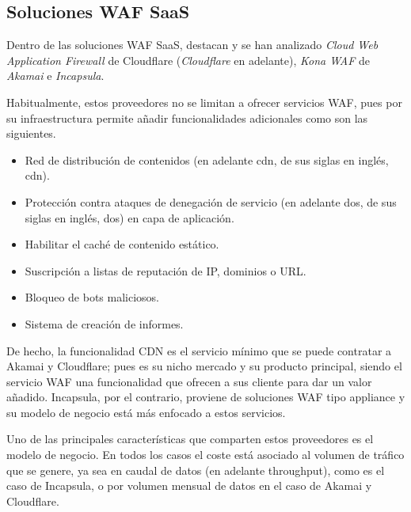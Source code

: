 \subsection{Soluciones WAF SaaS}
\par Dentro de las soluciones WAF SaaS, destacan y se han analizado {\em Cloud Web Application Firewall} \cite{cloudflarewaf} de Cloudflare\cite{cloudflare} ({\em Cloudflare} en adelante), {\em Kona WAF\cite{kona}} de {\em Akamai\cite{akamai}} e {\em Incapsula\cite{Incapsula}}.
\par Habitualmente, estos proveedores no se limitan a ofrecer servicios WAF, pues por su infraestructura permite añadir funcionalidades adicionales como son las siguientes.
\begin{itemize}
  \item Red de distribución de contenidos (en adelante \acrshort{cdn}, de sus siglas en inglés, \acrlong{cdn}).
  \item Protección contra ataques de denegación de servicio (en adelante \acrshort{dos}, de sus siglas en inglés, \acrlong{dos}) en capa de
    aplicación.
  \item Habilitar el caché de contenido estático.
  \item Suscripción a listas de reputación de IP, dominios o URL.
  \item Bloqueo de bots maliciosos.
  \item Sistema de creación de informes.
\end{itemize}
\par De hecho, la funcionalidad CDN es el servicio mínimo que se puede contratar a Akamai y Cloudflare; pues es su nicho mercado y su producto
principal, siendo el servicio WAF una funcionalidad que ofrecen a sus cliente para dar un valor añadido. Incapsula, por el contrario, proviene
de soluciones WAF tipo appliance y su modelo de negocio está más enfocado a estos servicios.
\par Uno de las principales características que comparten estos proveedores es el modelo de negocio. En todos los casos el coste está asociado
al volumen de tráfico que se genere, ya sea en caudal de datos (en adelante \gls{throughput}), como es el caso de Incapsula, o por volumen mensual de datos en el caso de Akamai y Cloudflare.

